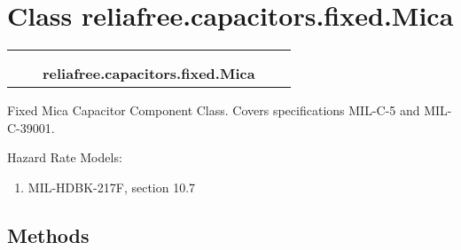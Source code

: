 %
%
%


\section{Class reliafree.capacitors.fixed.Mica}

    \label{reliafree:capacitors:fixed:Mica}
\begin{tabular}{cccccc}
\multicolumn{2}{r}{\settowidth{\BCL}{reliafree.capacitors.capacitor.Capacitor}\multirow{2}{\BCL}{reliafree.capacitors.capacitor.Capacitor}}
&&
  \\\cline{3-3}
  &&\multicolumn{1}{c|}{}
&&
  \\
&&\multicolumn{2}{l}{\textbf{reliafree.capacitors.fixed.Mica}}
\end{tabular}

Fixed Mica Capacitor Component Class. Covers specifications MIL-C-5 and 
MIL-C-39001.

Hazard Rate Models:

\begin{enumerate}

\setlength{\parskip}{0.5ex}
  \item MIL-HDBK-217F, section 10.7

\end{enumerate}



  \subsection{Methods}

    \vspace{0.5ex}


